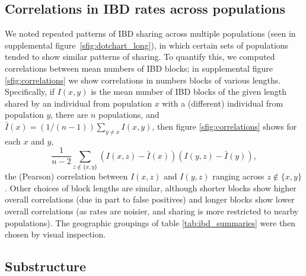 \documentclass{article}
\begin{document}
\subsection{Correlations in IBD rates across populations}
\label{ss:grouping_methods}

We noted repeated patterns of IBD sharing across multiple populations (seen in supplemental figure~\ref{sfig:dotchart_long}),
in which certain sets of populations tended to show similar patterns of sharing.
To quantify this, we computed correlations between mean numbers of IBD blocks;
in supplemental figure \ref{sfig:correlations} we show correlations in numbers blocks of various lengths.
Specifically, if $I(x,y)$ is the mean number of IBD blocks of the given length 
shared by an individual from population $x$ with a (different) individual from population $y$,
there are $n$ populations,
and $\bar I(x) = (1/(n-1)) \sum_{y\neq x} I(x,y)$,
then figure \ref{sfig:correlations} shows for each $x$ and $y$,
\begin{equation}
  \frac{1}{n-2} \sum_{z \notin\{x,y\}} (I(x,z) -\bar I(x)) ( I(y,z) -\bar I(y) ) ,
\end{equation}
the (Pearson) correlation between $I(x,z)$ and $I(y,z)$ ranging across $z \notin \{x,y\}$.
Other choices of block lengths are similar, although shorter blocks show higher overall correlations
(due in part to false positives)
and longer blocks show lower overall correlations 
(as rates are noisier, and sharing is more restricted to nearby populations).
The geographic groupings of table \ref{tab:ibd_summaries} were then chosen by visual inspection.

\subsection{Substructure}
\end{document}
